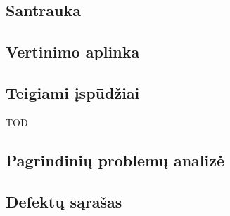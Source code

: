 \subsection{Santrauka}


\newpage
\subsection{Vertinimo aplinka}


\newpage
\subsection{Teigiami įspūdžiai}
TOD

\newpage
\subsection{Pagrindinių problemų analizė}


\newpage
\subsection{Defektų sąrašas}


